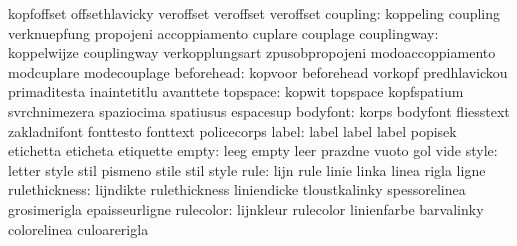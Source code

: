                            kopfoffset                offsethlavicky
                           veroffset                 veroffset
                           veroffset
                 coupling: koppeling                 coupling
                           verknuepfung              propojeni
                           accoppiamento             cuplare
                           couplage
              couplingway: koppelwijze               couplingway
                           verkopplungsart           zpusobpropojeni
                           modoaccoppiamento         modcuplare
                           modecouplage
               beforehead: kopvoor                   beforehead
                           vorkopf                   predhlavickou
                           primaditesta              inaintetitlu
                           avanttete
                 topspace: kopwit                    topspace
                           kopfspatium               svrchnimezera
                           spaziocima                spatiusus
                           espacesup
                 bodyfont: korps                     bodyfont
                           fliesstext                zakladnifont
                           fonttesto                 fonttext
                           policecorps
                    label: label                     label
                           label                     popisek
                           etichetta                 eticheta
                           etiquette
                    empty: leeg                      empty
                           leer                      prazdne
                           vuoto                     gol
                           vide
                    style: letter                    style
                           stil                      pismeno
                           stile                     stil
                           style
                     rule: lijn                      rule
                           linie                     linka
                           linea                     rigla
                           ligne
            rulethickness: lijndikte                 rulethickness
                           liniendicke               tloustkalinky
                           spessorelinea             grosimerigla
                           epaisseurligne
                rulecolor: lijnkleur                 rulecolor
                           linienfarbe               barvalinky
                           colorelinea               culoarerigla
